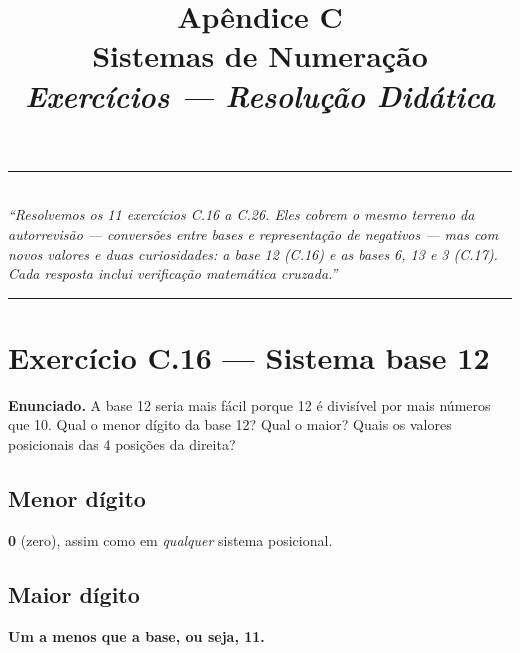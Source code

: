 \documentclass[11pt,a4paper]{article}
\title{
  \vspace{-1cm}
  {\Huge\bfseries\color{deitelblue} Ap\^endice C}\\[0.3em]
  {\Large\bfseries Sistemas de Numera\c{c}\~ao}\\[0.8em]
  {\large\itshape Exerc\'icios --- Resolu\c{c}\~ao Did\'atica}
}
\author{}
\date{}
\begin{document}
\maketitle
\thispagestyle{empty}
\vspace{-2em}

\begin{center}
\rule{0.85\textwidth}{0.5pt}\\[0.4em]
\textit{``Resolvemos os 11 exerc\'icios C.16 a C.26. Eles cobrem o mesmo terreno da autorrevis\~ao --- convers\~oes entre bases e representa\c{c}\~ao de negativos --- mas com novos valores e duas curiosidades: a base 12 (C.16) e as bases 6, 13 e 3 (C.17). Cada resposta inclui verifica\c{c}\~ao matem\'atica cruzada.''}\\[0.4em]
\rule{0.85\textwidth}{0.5pt}
\end{center}

\vspace{1em}

\section{Exerc\'icio C.16 --- Sistema base 12}

\begin{enunciado}
\textbf{Enunciado.} A base 12 seria mais f\'acil porque 12 \'e divis\'ivel por mais n\'umeros que 10. Qual o menor d\'igito da base 12? Qual o maior? Quais os valores posicionais das 4 posi\c{c}\~oes da direita?
\end{enunciado}

\subsection*{Menor d\'igito}

\begin{resposta}\textbf{0} (zero), assim como em \emph{qualquer} sistema posicional.\end{resposta}

\subsection*{Maior d\'igito}

\begin{resposta}\textbf{Um a menos que a base, ou seja, 11.}\end{resposta}
\end{document}
